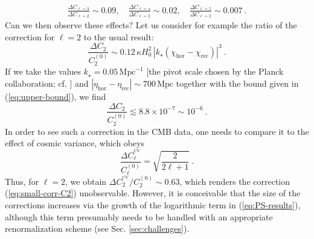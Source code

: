 \documentclass[12pt]{iopart}
\def\eq#1{\begin{equation}\begin{aligned}#1\end{aligned}\end{equation}}
\def\eref#1{(\ref{eq:#1})}
\begin{document}
\eq{
\frac{\Delta C_{\ell=3}}{\Delta C_{\ell=2}}\sim 0.09,\quad\frac{\Delta C_{\ell=4}}{\Delta C_{\ell=2}}\sim 0.02,
\quad\frac{\Delta C_{\ell=5}}{\Delta C_{\ell=2}}\sim 0.007 \ .
}
Can we then observe these effects? Let us consider for example the ratio of the correction for $\ell = 2$ to the usual result:
\begin{equation}
\frac{\Delta C_2}{C_2^{(0)}} \sim 0.12\,\kappa H_0^2\,|k_{\star}(\chi_\text{hor}-\chi_{\text{rec}})|^3\ .
\end{equation}
If we take the values $k_{\star} =0.05\,\text{Mpc}^{-1}$ [the pivot scale chosen by the Planck collaboration; cf. \citet{Planck2016}] and $|\eta_\text{hor}-\eta_{\text{rec}}| \sim 700\,\text{Mpc}$ \citep{Ashtekar:2016wpi} together with the bound given in \eref{upper-bound}, we find
\begin{equation}\label{eq:small-corr-C2}
\frac{\Delta C_2}{C_2^{(0)}} \lesssim 8.8\times 10^{-7} \sim 10^{-6} \ .
\end{equation}
In order to see such a correction in the CMB data, one needs to compare it to the effect of cosmic variance, which obeys
\begin{equation}
\frac{\Delta C_\ell^{^\text{CV}}}{C_\ell^{(0)}} =\sqrt{\frac{2}{2\ell +1}} \ .
\end{equation}
Thus, for $\ell = 2$, we obtain $\Delta C_2^{^\text{CV}}/C_2^{(0)} \sim 0.63$, which renders the correction \eref{small-corr-C2} unobservable. However, it is conceivable that the size of the corrections increases via the growth of the logarithmic term in \eref{PS-results}, although this term presumably needs to be handled with an appropriate renormalization scheme (see Sec. \ref{sec:challenges}).
\end{document}
